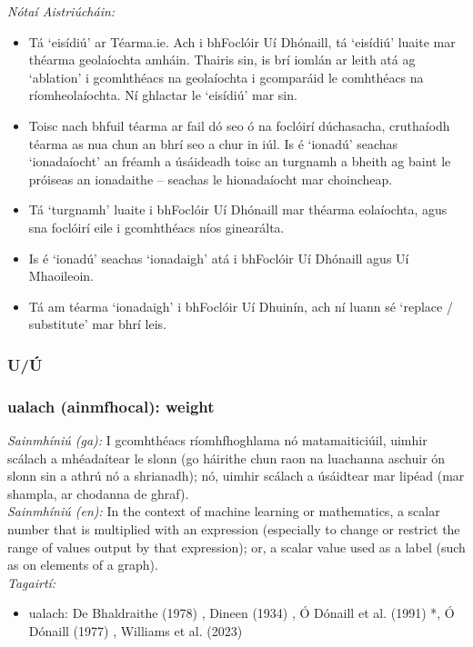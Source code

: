  \noindent \textit{Nótaí Aistriúcháin:}
\begin{itemize}
	\item Tá `eisídiú' ar Téarma.ie. Ach i bhFoclóir Uí Dhónaill, tá `eisídiú' luaite mar théarma geolaíochta amháin. Thairis sin, is brí iomlán ar leith atá ag `ablation' i gcomhthéacs na geolaíochta i gcomparáid le comhthéacs na ríomheolaíochta. Ní ghlactar le `eisídiú' mar sin.
	\item Toisc nach bhfuil téarma ar fail dó seo ó na foclóirí dúchasacha, cruthaíodh téarma as nua chun an bhrí seo a chur in iúl. Is é `ionadú' seachas `ionadaíocht' an fréamh a úsáideadh toisc an turgnamh a bheith ag baint le próiseas an ionadaithe -- seachas le hionadaíocht mar choincheap.
	\item Tá `turgnamh' luaite i bhFoclóir Uí Dhónaill mar théarma eolaíochta, agus sna foclóirí eile i gcomhthéacs níos ginearálta.
	\item Is é `ionadú' seachas `ionadaigh' atá i bhFoclóir Uí Dhónaill agus Uí Mhaoileoin.
	\item Tá am téarma `ionadaigh' i bhFoclóir Uí Dhuinín, ach ní luann sé `replace / substitute' mar bhrí leis.
\end{itemize}


 \subsubsection*{U/Ú}

\subsubsection*{ualach (ainmfhocal): weight}
 \noindent \textit{Sainmhíniú (ga):} I gcomhthéacs ríomhfhoghlama nó matamaiticiúil, uimhir scálach a mhéadaítear le slonn (go háirithe chun raon na luachanna aschuir ón slonn sin a athrú nó a shrianadh); nó, uimhir scálach a úsáidtear mar lipéad (mar shampla, ar chodanna de ghraf).
\\
 \noindent \textit{Sainmhíniú (en):} In the context of machine learning or mathematics, a scalar number that is multiplied with an expression (especially to change or restrict the range of values output by that expression); or, a scalar value used as a label (such as on elements of a graph).
\\
 \noindent \textit{Tagairtí:}
\begin{itemize}
	\item ualach: De Bhaldraithe (1978) \cite{de-bhaldraithe}, Dineen (1934) \cite{dineen}, Ó Dónaill et al. (1991) \cite{focloir-beag}*, Ó Dónaill (1977) \cite{odonaill}, Williams et al. (2023) \cite{storchiste}
\end{itemize}

